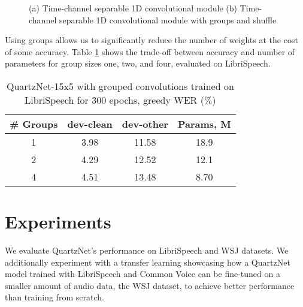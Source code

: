 \documentclass{article}
\begin{document}
\begin{figure}[h]
 \centering
 \caption{(a) Time-channel separable 1D convolutional module (b) Time-channel separable 1D convolutional module with groups and shuffle}
 \label{fig:quartz_arch_groups}
\end{figure}

Using groups allows us to significantly reduce the number of weights at the cost of some accuracy. Table \ref{tab:GroupConv} shows the trade-off between accuracy and number of parameters for group sizes one, two, and four, evaluated on LibriSpeech. 

\begin{table}[thb]
\centering
\caption{QuartzNet-15x5 with grouped convolutions trained on LibriSpeech for 300 epochs, greedy WER ($\%$)}
\vspace{4pt}
\label{tab:GroupConv}
\begin{tabular}{c c c c} 
 \hline
 {\textbf{\# Groups}} & {\textbf{dev-clean}} & {\textbf{dev-other}} & {\textbf{Params, M}} \\
 \hline
 1  & 3.98 & 11.58 & 18.9 \\ 
 2  & 4.29 & 12.52 & 12.1 \\ 
 4  & 4.51 & 13.48 & 8.70 \\ 
 \hline
\end{tabular}
\end{table}

\iffalse{
\subsection{QuartzNet with attention-based RNN decoder - WIP}
We used QuartzNet with CTC loss, but the QuartzNet encoder can be used also with different decoders. For example we combined QuartzNet with attention-based RNN decoder (\ref{fig:quartz_arnn}:

\begin{figure}[thb]
 \centering
 \scalebox{1.0}{
 \texttt{[image: quartznet-arnn.png]}
 }
 \caption{QuartzNet-ARNN: QuartzNet-based encoder + Attention based RNN decoder}
 \label{fig:quartz_arnn}
\end{figure}
}\fi

\section{Experiments}
We  evaluate QuartzNet's performance on LibriSpeech and WSJ datasets. We additionally experiment with  a transfer learning showcasing how a QuartzNet model trained with LibriSpeech and Common Voice \cite{CommonVoice} can be fine-tuned on a smaller amount of audio data, the WSJ dataset, to achieve better performance than training from scratch.
\end{document}
